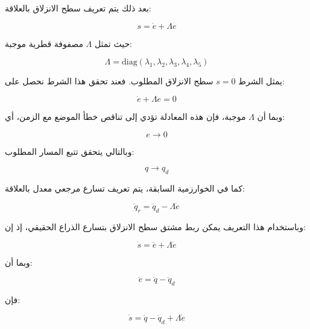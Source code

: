 بعد ذلك يتم تعريف سطح الانزلاق بالعلاقة:

\begin{equation}
s=\dot{e}+\Lambda e
\label{eq:smc_sliding_surface}
\end{equation}

حيث تمثل \(\Lambda\) مصفوفة قطرية موجبة:

\begin{equation}
\Lambda=
\mathrm{diag}
\left(
\lambda_1,
\lambda_2,
\lambda_3,
\lambda_4,
\lambda_5
\right)
\label{eq:smc_lambda_matrix}
\end{equation}

يمثل الشرط \(s=0\) سطح الانزلاق المطلوب. فعند تحقق هذا الشرط نحصل على:

\begin{equation}
\dot{e}+\Lambda e=0
\label{eq:smc_error_dynamics}
\end{equation}

وبما أن \(\Lambda\) موجبة، فإن هذه المعادلة تؤدي إلى تناقص خطأ الموضع مع الزمن، أي:

\begin{equation}
e\rightarrow 0
\label{eq:smc_error_convergence}
\end{equation}

وبالتالي يتحقق تتبع المسار المطلوب:

\begin{equation}
q\rightarrow q_d
\label{eq:smc_tracking_goal}
\end{equation}

كما في الخوارزمية السابقة، يتم تعريف تسارع مرجعي معدل بالعلاقة:

\begin{equation}
\ddot{q}_r=
\ddot{q}_d
-
\Lambda\dot{e}
\label{eq:smc_modified_reference_acceleration}
\end{equation}

وباستخدام هذا التعريف يمكن ربط مشتق سطح الانزلاق بتسارع الذراع الحقيقي، إذ إن:

\begin{equation}
\dot{s}
=
\ddot{e}
+
\Lambda\dot{e}
\label{eq:smc_s_derivative_1}
\end{equation}

وبما أن:

\begin{equation}
\ddot{e}
=
\ddot{q}
-
\ddot{q}_d
\label{eq:smc_acceleration_error}
\end{equation}

فإن:

\begin{equation}
\dot{s}
=
\ddot{q}
-
\ddot{q}_d
+
\Lambda\dot{e}
\label{eq:smc_s_derivative_2}
\end{equation}

